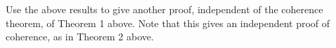 Use the above results to give another proof, independent of the coherence theorem, of Theorem 1 above. Note that this gives an independent proof of coherence, as in Theorem 2 above.
